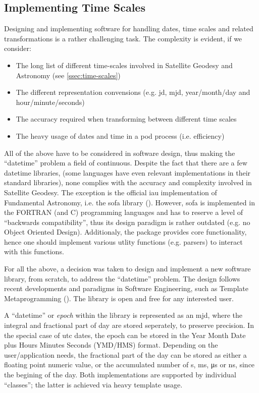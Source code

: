 \subsection{Implementing Time Scales}\label{ssec:time-scales-implementation}

Designing and implementing software for handling dates, time scales and related transformations 
is a rather challenging task. The complexity is evident, if we consider:
\begin{itemize}
    \item The long list of different time-scales involved in Satellite Geodesy and 
        Astronomy (see \ref{ssec:time-scales})
    \item The different representation convensions (e.g. \gls{jd}, \gls{mjd}, year/month/day and hour/minute/seconds)
    \item The accuracy required when transforming between different time scales 
    \item The heavy usage of dates and time in a \gls{pod} process (i.e. efficiency)
\end{itemize}
All of the above have to be considered in software design, thus making the ``datetime'' 
problem a field of continuous. Despite the fact that there are a few datetime libraries, 
(some languages have even relevant implementations in their standard libraries), none 
complies with the accuracy and complexity involved in Satellite Geodesy. The exception 
is the official \gls{iau} implementation of Fundamental Astronomy, i.e. the \gls{sofa} 
library (\cite{sofa2021}). However, \gls{sofa} is implemented in the FORTRAN (and C) 
programming languages and has to reserve a level of ``backwards compatibility'', thus 
its design paradigm is rather outdated (e.g. no Object Oriented Design). Additionaly, 
the package provides core functionality, hence one should implement various utlity functions 
(e.g. parsers) to interact with this functions.

For all the above, a decision was taken to design and implement a new software library, 
from scratch, to address the ``datetime'' problem. The design follows recent developments 
and paradigms in Software Engineering, such as Template Metaprogramming 
(\cite{Vandevoorde2017}). The library is open and free for any interested user.

A ``datetime'' or \emph{epoch} within the library is represented as an \gls{mjd}, 
where the integral and fractional part of day are stored seperately, to preserve 
precision. In the special case of \gls{utc} dates, the epoch can be stored in the 
Year Month Date plus Hours Minutes Seconds (YMD/HMS) format. Depending on the user/application 
needs, the fractional part of the day can be stored as either a floating point numeric 
value, or the accumulated number of \si{\second}, \si{\milli\second}, \si{\micro\second} or 
\si{\nano\second}, since the begining of the day. Both implementations are supported by 
individual ``classes''; the latter is achieved via heavy template usage. 

